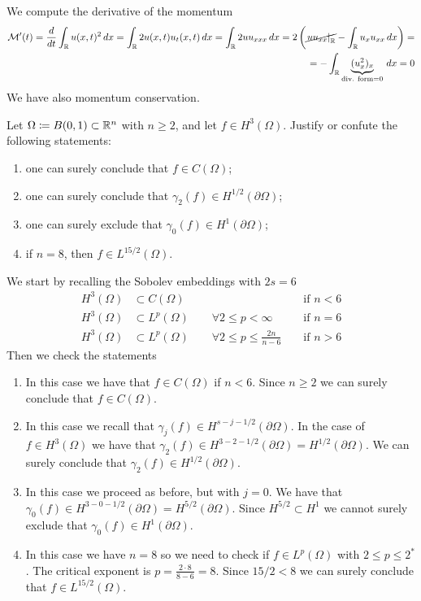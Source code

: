 We compute the derivative of the momentum
\[
    \begin{split}
        \mathcal{M}'(t) = \frac{d}{dt} \int_{\mathbb{R}} u(x,t)^2 \, dx = \int_{\mathbb{R}} 2 u(x,t) u_t(x,t) \, dx = \int_{\mathbb{R}} 2 u u_{xxx} \, dx = 2\left(\cancel{\left. u u_{xx} \right|_{\mathbb{R}}} - \int_{\mathbb{R}} u_x u_{xx} \, dx\right) = \\
        = - \int_{\mathbb{R}} \underbrace{(u_x^2)_x}_{\text{div. form} = 0} \, dx = 0
    \end{split}
\]
We have also momentum conservation.

\newpage
\begin{exercise}
    Let \(\Omega \coloneqq B(0, 1) \subset \mathbb{R}^n\) with \(n \geq 2\), and let \(f \in H^3(\Omega)\). Justify or confute the following statements:
    \begin{enumerate}
        \item one can surely conclude that \(f \in C(\Omega)\);
        \item one can surely conclude that \(\gamma_2(f) \in H^{1/2}(\partial\Omega)\);
        \item one can surely exclude that \(\gamma_0(f) \in H^{1}(\partial\Omega)\);
        \item if \(n = 8\), then \(f \in L^{15/2}(\Omega)\).
    \end{enumerate}
\end{exercise}
We start by recalling the Sobolev embeddings with \(2s = 6\)
\begin{align*}
    H^3(\Omega) &\subset C(\Omega) && \text{ if } n < 6 \\
    H^3(\Omega) &\subset L^p(\Omega) \qquad \forall 2 \leq p < \infty && \text{ if } n = 6 \\
    H^3(\Omega) &\subset L^p(\Omega) \qquad \forall 2 \leq p \leq \frac{2n}{n - 6} && \text{ if } n > 6
\end{align*}
Then we check the statements
\begin{enumerate}
    \item In this case we have that \(f \in C(\Omega)\) if \(n < 6\). Since \(n \geq 2\) we can surely conclude that \(f \in C(\Omega)\).
    \item In this case we recall that \(\gamma_j(f) \in H^{s - j - 1/2}(\partial\Omega)\). In the case of \(f \in H^3(\Omega)\) we have that \(\gamma_2(f) \in H^{3 - 2 - 1/2}(\partial\Omega) = H^{1/2}(\partial\Omega)\). We can surely conclude that \(\gamma_2(f) \in H^{1/2}(\partial\Omega)\).
    \item In this case we proceed as before, but with \(j = 0\). We have that \(\gamma_0(f) \in H^{3 - 0 - 1/2}(\partial\Omega) = H^{5/2}(\partial\Omega)\). Since \(H^{5/2} \subset H^1\) we cannot surely exclude that \(\gamma_0(f) \in H^{1}(\partial\Omega)\).
    \item In this case we have \(n = 8\) so we need to check if \(f \in L^p(\Omega)\) with \(2\leq p \leq 2^*\). The critical exponent is \(p = \frac{2\cdot 8}{8 - 6} = 8\). Since \(15/2 < 8\) we can surely conclude that \(f \in L^{15/2}(\Omega)\). 
\end{enumerate}

